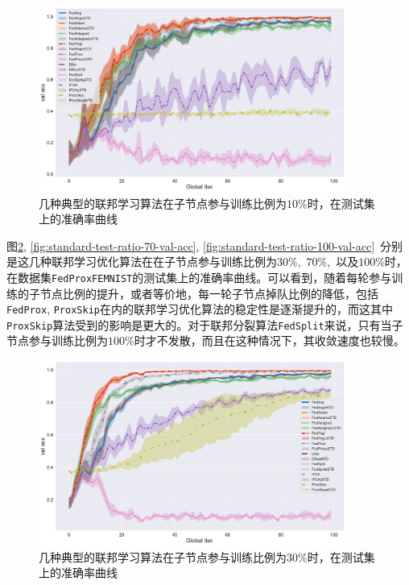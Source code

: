 \begin{figure}[H]
    \centering
    \includegraphics[width=0.9\textwidth]{figures/standard-test-ratio-10-val-acc.pdf}
    \caption{几种典型的联邦学习算法在子节点参与训练比例为$10\%$时，在测试集上的准确率曲线}
    \label{fig:standard-test-ratio-10-val-acc}
\end{figure}

图\ref{fig:standard-test-ratio-30-val-acc}, \ref{fig:standard-test-ratio-70-val-acc}, \ref{fig:standard-test-ratio-100-val-acc}~分别是这几种联邦学习优化算法在在子节点参与训练比例为$30\%,$ $70\%,$ 以及$100\%$时，在数据集\texttt{FedProxFEMNIST}的测试集上的准确率曲线。可以看到，随着每轮参与训练的子节点比例的提升，或者等价地，每一轮子节点掉队比例的降低，包括\texttt{FedProx}, \texttt{ProxSkip}在内的联邦学习优化算法的稳定性是逐渐提升的，而这其中\texttt{ProxSkip}算法受到的影响是更大的。对于联邦分裂算法\texttt{FedSplit}来说，只有当子节点参与训练比例为$100\%$时才不发散，而且在这种情况下，其收敛速度也较慢。

\begin{figure}[H]
    \centering
    \includegraphics[width=0.9\textwidth]{figures/standard-test-ratio-30-val-acc.pdf}
    \caption{几种典型的联邦学习算法在子节点参与训练比例为$30\%$时，在测试集上的准确率曲线}
    \label{fig:standard-test-ratio-30-val-acc}
\end{figure}

